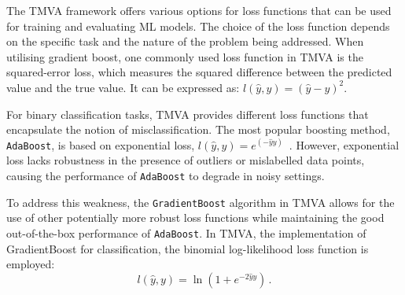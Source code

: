 The TMVA framework offers various options for loss functions that can be used 
for training and evaluating ML models. The choice of the loss function depends 
on the specific task and the nature of the problem being addressed.
When utilising gradient boost, one commonly used loss function in TMVA is the squared-error loss, which measures 
the squared difference between the predicted value and the true value. It can be expressed as: $l(\hat{y}, y) = (\hat{y} - y)^2$.



For binary classification tasks, TMVA provides different loss functions that encapsulate 
the notion of misclassification. The most popular boosting method, \texttt{AdaBoost},
is based on exponential loss, $l(\hat{y}, y) = e^{(-\hat{y}y)}$~\cite{freund1995decision}.
However, exponential loss lacks robustness in the presence of outliers or mislabelled 
data points, causing the performance of \texttt{AdaBoost} to degrade in noisy settings.


To address this weakness, the \texttt{GradientBoost} algorithm in TMVA allows for the use of 
other potentially more robust loss functions while maintaining the good out-of-the-box 
performance of \texttt{AdaBoost}. In TMVA, the implementation of GradientBoost for classification, 
the binomial log-likelihood loss function is employed:
\begin{equation*}
l(\hat{y}, y) = \ln\left(1 + e^{-2\hat{y}y}\right) \,.
\end{equation*}




